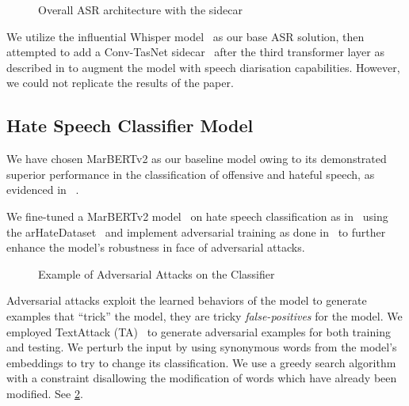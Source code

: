 \documentclass[10pt,twocolumn,letterpaper]{article}
\begin{document}
\begin{figure}[h]
    \centering
    
    \caption{Overall ASR architecture with the sidecar \cite{mengUnifiedModelingMultiTalker2023}}
    \label{fig:asr-sidecar}
\end{figure}

We utilize the influential Whisper model~ \cite{radfordRobustSpeechRecognition2022}
as our base ASR solution, then attempted to add a Conv-TasNet sidecar~\cite{luoConvTasNetSurpassingIdeal2019} after the third transformer layer as described in \cite{mengUnifiedModelingMultiTalker2023} to augment the model with speech diarisation capabilities.
However, we could not replicate the results of the paper.

\subsection{Hate Speech Classifier Model}
\label{sec:hate-detector}
We have chosen MarBERTv2 as our baseline model owing to its demonstrated superior performance in the classification of offensive and hateful speech, as evidenced in ~\cite{shapiroAlexUAICArabicHate2022}.


We fine-tuned a MarBERTv2 model~\cite{abdul-mageedARBERTMARBERTDeep2021} on hate speech classification as in~\cite{shapiroAlexUAICArabicHate2022} using the arHateDataset~\cite{khezzarArHateDetectorDetectionHate2023} and implement adversarial training as done in~ \cite{xiangBuildRobustTextbased2022} to further enhance the model's robustness in face of adversarial attacks.

\begin{figure}[h]
    \centering
    
    \caption{Example of Adversarial Attacks on the Classifier}
    \label{fig:adversarial-attack}
\end{figure}

Adversarial attacks exploit the learned behaviors of the model to generate examples that ``trick'' the model, they are tricky \emph{false-positives} for the model. 
We employed TextAttack (TA)~\cite{morrisTextAttackFrameworkAdversarial2020} to generate adversarial examples for both training and testing.
We perturb the input by using synonymous words from the model's embeddings to try to change its classification.
We use a greedy search algorithm with a constraint disallowing the modification of words which have already been modified. See \cref{fig:adversarial-attack}.
\end{document}

